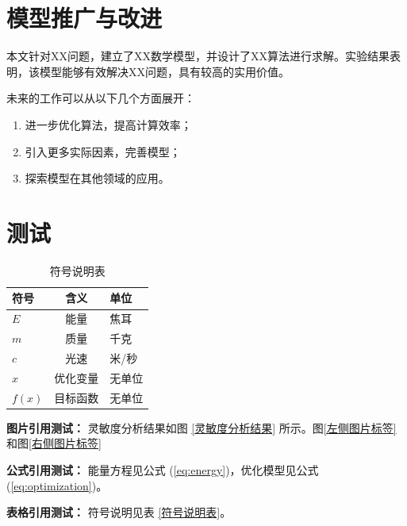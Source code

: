 \documentclass[12pt]{article}
\begin{document}
\section{模型推广与改进}

本文针对XX问题，建立了XX数学模型，并设计了XX算法进行求解。实验结果表明，该模型能够有效解决XX问题，具有较高的实用价值。

未来的工作可以从以下几个方面展开：

\begin{enumerate}[label=(\arabic*)]
    \item 进一步优化算法，提高计算效率；
    \item 引入更多实际因素，完善模型；
    \item 探索模型在其他领域的应用。
\end{enumerate}


\section{测试}
\begin{table}[H]
    \centering
    \caption{符号说明表}
    \label{符号说明表}
    \begin{tabularx}{0.7\textwidth}{|>{\centering\arraybackslash}X|c|>{\centering\arraybackslash}X|}
        \hline
        符号 & 含义 & 单位 \\
        \hline
        $E$ & 能量 & 焦耳 \\
        $m$ & 质量 & 千克 \\
        $c$ & 光速 & 米/秒 \\
        $x$ & 优化变量 & 无单位 \\
        $f(x)$ & 目标函数 & 无单位 \\
        \hline
    \end{tabularx}
\end{table}
\noindent\textbf{图片引用测试：} 灵敏度分析结果如图 \eqref{灵敏度分析结果} 所示。图\eqref{左侧图片标签}和图\eqref{右侧图片标签}

\noindent\textbf{公式引用测试：} 能量方程见公式 (\ref{eq:energy})，优化模型见公式 (\ref{eq:optimization})。

\noindent\textbf{表格引用测试：} 符号说明见表 \eqref{符号说明表}。
\end{document}
